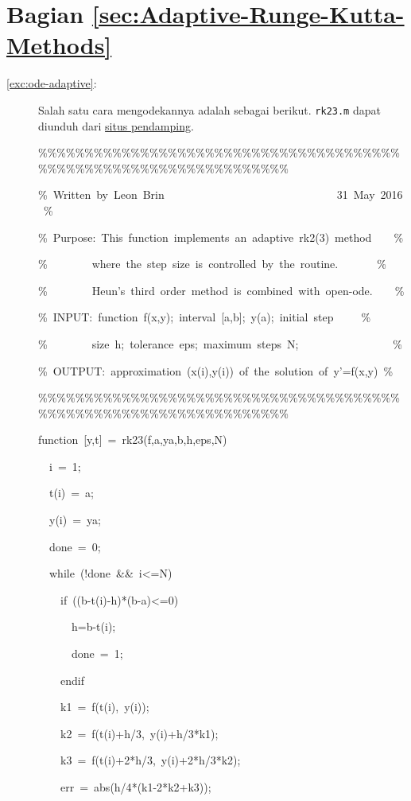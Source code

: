 \section*{Bagian \ref{sec:Adaptive-Runge-Kutta-Methods}}
\begin{description}
\item [{\ref{exc:ode-adaptive}:}] Salah satu cara mengodekannya adalah
sebagai berikut. \texttt{rk23.m} dapat
diunduh dari \href{http://lqbrin.github.io/tea-time-numerical/ancillaries.html}{situs pendamping}.

\begin{lyxcode}
\%\%\%\%\%\%\%\%\%\%\%\%\%\%\%\%\%\%\%\%\%\%\%\%\%\%\%\%\%\%\%\%\%\%\%\%\%\%\%\%\%\%\%\%\%\%\%\%\%\%\%\%\%\%\%\%\%\%\%\%\%\%\%\%\%\%

\%~Written~by~Leon~Brin~~~~~~~~~~~~~~~~~~~~~~~~~~~~~~~31~May~2016~\%

\%~Purpose:~This~function~implements~an~adaptive~rk2(3)~method~~~~\%

\%~~~~~~~~where~the~step~size~is~controlled~by~the~routine.~~~~~~~\%

\%~~~~~~~~Heun's~third~order~method~is~combined~with~open-ode.~~~~\%

\%~INPUT:~function~f(x,y);~interval~{[}a,b{]};~y(a);~initial~step~~~~~\%

\%~~~~~~~~size~h;~tolerance~eps;~maximum~steps~N;~~~~~~~~~~~~~~~~~\%

\%~OUTPUT:~approximation~(x(i),y(i))~of~the~solution~of~y'=f(x,y)~\%

\%\%\%\%\%\%\%\%\%\%\%\%\%\%\%\%\%\%\%\%\%\%\%\%\%\%\%\%\%\%\%\%\%\%\%\%\%\%\%\%\%\%\%\%\%\%\%\%\%\%\%\%\%\%\%\%\%\%\%\%\%\%\%\%\%\%

function~{[}y,t{]}~=~rk23(f,a,ya,b,h,eps,N)

~~i~=~1;

~~t(i)~=~a;

~~y(i)~=~ya;

~~done~=~0;

~~while~(!done~\&\&~i<=N)

~~~~if~((b-t(i)-h){*}(b-a)<=0)

~~~~~~h=b-t(i);

~~~~~~done~=~1;

~~~~endif

~~~~k1~=~f(t(i),~y(i));

~~~~k2~=~f(t(i)+h/3,~y(i)+h/3{*}k1);

~~~~k3~=~f(t(i)+2{*}h/3,~y(i)+2{*}h/3{*}k2);

~~~~err~=~abs(h/4{*}(k1-2{*}k2+k3));


\end{lyxcode}
\end{description}
